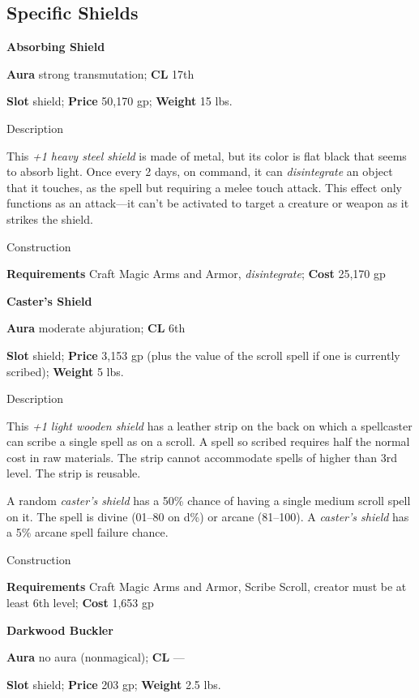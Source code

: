 \subsection{Specific Shields}

				
\textbf{Absorbing Shield}
				
\textbf{Aura} strong transmutation; \textbf{CL} 17th
				
\textbf{Slot} shield; \textbf{Price} 50,170 gp; \textbf{Weight }15 lbs.
				
Description
				
This \textit{+1 heavy steel shield} is made of metal, but its color is flat black that seems to absorb light. Once every 2 days, on command, it can \textit{disintegrate} an object that it touches, as the spell but requiring a melee touch attack. This effect only functions as an attack---it can't be activated to target a creature or weapon as it strikes the shield.
				
Construction
				
\textbf{Requirements} Craft Magic Arms and Armor, \textit{disintegrate}; \textbf{Cost }25,170 gp
				
\textbf{Caster's Shield}
				
\textbf{Aura} moderate abjuration; \textbf{CL} 6th
				
\textbf{Slot} shield; \textbf{Price} 3,153 gp (plus the value of the scroll spell if one is currently scribed); \textbf{Weight }5 lbs.
				
Description
				
This \textit{+1 light wooden shield} has a leather strip on the back on which a spellcaster can scribe a single spell as on a scroll. A spell so scribed requires half the normal cost in raw materials. The strip cannot accommodate spells of higher than 3rd level. The strip is reusable.
				
A random \textit{caster's shield} has a 50\% chance of having a single medium scroll spell on it. The spell is divine (01--80 on d\%) or arcane (81--100). A \textit{caster's shield} has a 5\% arcane spell failure chance. 
				
Construction
				
\textbf{Requirements} Craft Magic Arms and Armor, Scribe Scroll, creator must be at least 6th level; \textbf{Cost }1,653 gp
				
\textbf{Darkwood Buckler}
				
\textbf{Aura} no aura (nonmagical); \textbf{CL} ---
				
\textbf{Slot} shield; \textbf{Price} 203 gp; \textbf{Weight }2.5 lbs.
				

